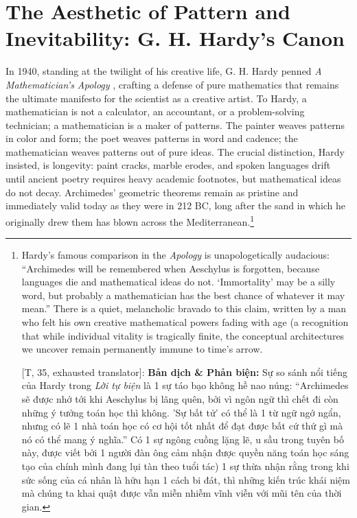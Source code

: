 \documentclass[11pt]{article}
\begin{document}
\section{The Aesthetic of Pattern and Inevitability: G. H. Hardy's Canon}
In 1940, standing at the twilight of his creative life, G. H. Hardy penned \textit{A Mathematician's Apology} \cite{Hardy1940}, crafting a defense of pure mathematics that remains the ultimate manifesto for the scientist as a creative artist. To Hardy, a mathematician is not a calculator, an accountant, or a problem-solving technician; a mathematician is a maker of patterns. The painter weaves patterns in color and form; the poet weaves patterns in word and cadence; the mathematician weaves patterns out of pure ideas. The crucial distinction, Hardy insisted, is longevity: paint cracks, marble erodes, and spoken languages drift until ancient poetry requires heavy academic footnotes, but mathematical ideas do not decay. Archimedes' geometric theorems remain as pristine and immediately valid today as they were in 212 BC, long after the sand in which he originally drew them has blown across the Mediterranean.\footnote{Hardy's famous comparison in the \textit{Apology} is unapologetically audacious: ``Archimedes will be remembered when Aeschylus is forgotten, because languages die and mathematical ideas do not. `Immortality' may be a silly word, but probably a mathematician has the best chance of whatever it may mean.'' There is a quiet, melancholic bravado to this claim, written by a man who felt his own creative mathematical powers fading with age (a recognition that while individual vitality is tragically finite, the conceptual architectures we uncover remain permanently immune to time's arrow.
	
	\textsf{[T, 35, exhausted translator]:} \textbf{Bản dịch \& Phản biện:} Sự so sánh nổi tiếng của Hardy trong \textit{Lời tự biện} là 1 sự táo bạo không hề nao núng: ``Archimedes sẽ được nhớ tới khi Aeschylus bị lãng quên, bởi vì ngôn ngữ thì chết đi còn những ý tưởng toán học thì không. 'Sự bất tử' có thể là 1 từ ngữ ngớ ngẩn, nhưng có lẽ 1 nhà toán học có cơ hội tốt nhất để đạt được bất cứ thứ gì mà nó có thể mang ý nghĩa.'' Có 1 sự ngông cuồng lặng lẽ, u sầu trong tuyên bố này, được viết bởi 1 người đàn ông cảm nhận được quyền năng toán học sáng tạo của chính mình đang lụi tàn theo tuổi tác) 1 sự thừa nhận rằng trong khi sức sống của cá nhân là hữu hạn 1 cách bi đát, thì những kiến trúc khái niệm mà chúng ta khai quật được vẫn miễn nhiễm vĩnh viễn với mũi tên của thời gian.}
\end{document}
